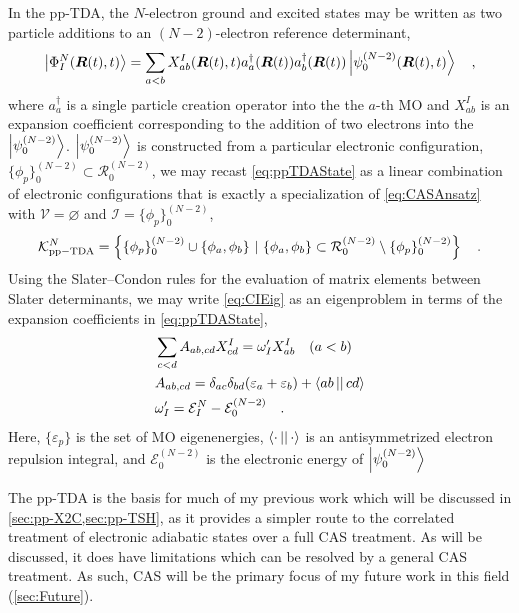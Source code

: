 In the pp-TDA, the $N$-electron ground and excited states may be written as two
particle additions to an $(N-2)$-electron reference determinant,
\begin{equation}
\left\vert \Phi_I^N (\boldsymbol{R}(t),t) \right\rangle = \sum_{a < b} X_{ab}^I(\boldsymbol{R}(t),t)
a_a^\dagger(\boldsymbol{R}(t)) a_b^\dagger (\boldsymbol{R}(t))
\left\vert \psi_0^{(N-2)}(\boldsymbol{R}(t),t) \right\rangle \quad, \label{eq:ppTDAState}
\end{equation}
where $a_a^\dagger$ is a single particle creation operator into the the $a$-th
MO and $X_{ab}^I$ is an expansion coefficient corresponding to the addition of
two electrons into the $\left\vert \psi_0^{(N-2)} \right\rangle$. $\left\vert \psi_0^{(N-2)} \right\rangle$ is
constructed from a particular electronic configuration, $\{ \phi_p \}^{(N-2)}_0
\subset \mathcal{R}^{(N-2)}_0$, we may recast \cref{eq:ppTDAState} as a linear
combination of electronic configurations that is exactly a specialization of
\cref{eq:CASAnsatz} with $\mathcal{V} = \varnothing$ and $\mathcal{I} = \{
\phi_p \}^{(N-2)}_0$,
\begin{equation}
\mathcal{K}_\mathrm{pp-TDA}^N =
\left\lbrace \{ \phi_p \}^{(N-2)}_0 \cup \{\phi_a,\phi_b \} \text{ }\vert\text{ } 
\{ \phi_a,\phi_b \} \subset \mathcal{R}^{(N-2)}_0 \setminus \{\phi_p \}^{(N-2)}_0 
\right\rbrace \quad.
\end{equation}
Using the Slater--Condon rules for the evaluation of matrix elements between
Slater determinants\cite{Szabo}, we may write \cref{eq:CIEig} as an eigenproblem
in terms of the expansion coefficients in \cref{eq:ppTDAState},
\begin{align}
&\sum_{c < d} A_{ab,cd} X_{cd}^I = \omega'_I X_{ab}^I \quad (a < b)
\label{eq:ppTDAEig}\\
&A_{ab,cd} = \delta_{ac}\delta_{bd}(\varepsilon_a + \varepsilon_b) + 
  \left\langle ab \left\vert  \right\vert cd \right\rangle \\
&\omega'_I = \mathcal{E}^{N}_I - \mathcal{E}^{(N-2)}_0
\quad.
\end{align}
Here, $\{\varepsilon_p\}$ is the set of MO eigenenergies,
$\left\langle \cdot \left\vert  \right\vert \cdot \right\rangle$ is an antisymmetrized electron repulsion integral,
and $\mathcal{E}_0^{(N-2)}$ is the electronic energy of $\left\vert \psi_0^{(N-2)} \right\rangle$

The pp-TDA is the basis for much of my previous work which will be discussed in
\cref{sec:pp-X2C,sec:pp-TSH}, as it provides a simpler route to the correlated
treatment of electronic adiabatic states over a full CAS treatment. As will be
discussed, it does have limitations which can be resolved by a general CAS
treatment. As such, CAS will be the primary focus of my future work in this
field (\cref{sec:Future}).

